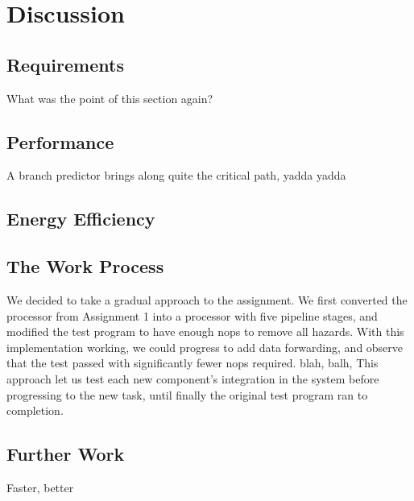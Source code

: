 \chapter{Discussion}

\section{Requirements}
What was the point of this section again?

\section{Performance}
A branch predictor brings along quite the critical path, yadda yadda

\section{Energy Efficiency}

\section{The Work Process}
We decided to take a gradual approach to the assignment.
We first converted the processor from Assignment 1 into a processor with five pipeline stages, and modified the test program to have enough nops to remove all hazards.
With this implementation working, we could progress to add data forwarding, and observe that the test passed with significantly fewer nops required.
blah, balh, This approach let us test each new component's integration in the system before progressing to the new task, until finally the original test program ran to completion.

\section{Further Work}
Faster, better
